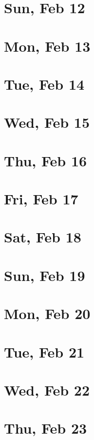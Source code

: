 	\section{Sun, Feb 12}
		
	\section{Mon, Feb 13}
		
	\section{Tue, Feb 14}
		
	\section{Wed, Feb 15}
		
	\section{Thu, Feb 16}
		
	\section{Fri, Feb 17}
		
	\section{Sat, Feb 18}
		
	\section{Sun, Feb 19}
		
	\section{Mon, Feb 20}
		
	\section{Tue, Feb 21}
		
	\section{Wed, Feb 22}
		
	\section{Thu, Feb 23}
		
